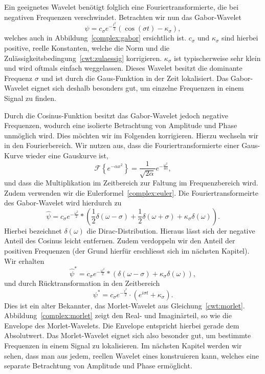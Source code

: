 \begin{refsection}
Ein geeignetes Wavelet benötigt folglich eine Fouriertransformierte, die bei negativen Frequenzen verschwindet.
Betrachten wir nun das Gabor-Wavelet
\[
	\psi = c_\sigma e^{-\frac{t^2}{2}}\left(\cos\left(\sigma t\right) - \kappa_\sigma\right),
\]
welches auch in Abbildung~\ref{complex:gabor} ersichtlich ist.
$c_\sigma$ und $\kappa_\sigma$ sind hierbei positive, reelle Konstanten, welche die Norm und die Zulässigkeitsbedingung~\eqref{cwt:zulaessig} korrigieren.
$\kappa_\sigma$ ist typischerweise sehr klein und wird oftmals einfach weggelassen.
Dieses Wavelet besitzt die dominante Frequenz $\sigma$ und ist durch die Gaus-Funktion in der Zeit lokalisiert.
Das Gabor-Wavelet eignet sich deshalb besonders gut, um einzelne Frequenzen in einem Signal zu finden.

Durch die Cosinus-Funktion besitzt das Gabor-Wavelet jedoch negative Frequenzen, wodurch eine isolierte Betrachtung von Amplitude und Phase unmöglich wird.
Dies möchten wir im Folgenden korrigieren.
Hierzu wechseln wir in den Fourierbereich.
Wir nutzen aus, dass die Fouriertransformierte einer Gaus-Kurve wieder eine Gauskurve ist,
\[
	\mathcal{F}\left\lbrace e^{-\alpha x^2} \right\rbrace 
	= \frac{1}{\sqrt{2\alpha}}e^{- \frac{\omega^2}{4\alpha}},
\]
und dass die Multiplikation im Zeitbereich zur Faltung im Frequenzbereich wird.
Zudem verwenden wir die Eulerformel~\eqref{complex:euler}.
Die Fouriertransformeirte des Gabor-Wavelet wird hierdurch zu
\[
 \hat{\psi} = 
 c_\sigma e^{- \frac{\omega^2}{2}} * \left(
  \frac{1}{2}\delta(\omega - \sigma) +
  \frac{1}{2}\delta(\omega + \sigma) + 
  \kappa_\sigma\delta(\omega)
  \right).
\]
Hierbei bezeichnet $\delta(\omega)$ die Dirac-Distribution.
Hieraus lässt sich der negative Anteil des Cosinus leicht entfernen.
Zudem verdoppeln wir den Anteil der positiven Frequenzen (der Grund hierfür erschliesst sich im nächsten Kapitel).
Wir erhalten
\[
	\hat{\psi}^\ast = 
	c_\sigma e^{- \frac{\omega^2}{2}} * \left(
	\delta(\omega - \sigma) +
	\kappa_\sigma\delta(\omega)
	\right),
\]
und durch Rücktransformation in den Zeitbereich
\[
	\psi^\ast = 
	c_\sigma e^{- \frac{t^2}{2}} \cdot \left(
	e^{i\sigma t} +
	\kappa_\sigma
	\right).
\]
Dies ist ein alter Bekannter, das Morlet-Wavelet aus Gleichung~\eqref{cwt:morlet}.
Abbildung~\ref{complex:morlet} zeigt den Real- und Imaginärteil, so wie die Envelope des Morlet-Wavelets.
Die Envelope entspricht hierbei gerade dem Absolutwert.
Das Morlet-Wavelet eignet sich also besonder gut, um bestimmte Frequenzen in einem Signal zu lokalisieren.
Im nächsten Kapitel werden wir sehen, dass man aus jedem, reellen Wavelet eines konstruieren kann, welches eine separate Betrachtung von Amplitude und Phase ermöglicht.


\end{refsection}
